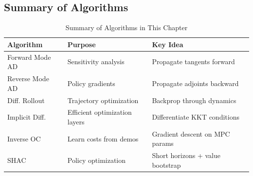 \subsection{Summary of Algorithms}

\begin{table}[htbp]
\centering
\caption{Summary of Algorithms in This Chapter}
\label{tab:algorithm_summary}
\begin{tabular}{lll}
\toprule
\textbf{Algorithm} & \textbf{Purpose} & \textbf{Key Idea} \\
\midrule
Forward Mode AD & Sensitivity analysis & Propagate tangents forward \\
Reverse Mode AD & Policy gradients & Propagate adjoints backward \\
Diff. Rollout & Trajectory optimization & Backprop through dynamics \\
Implicit Diff. & Efficient optimization layers & Differentiate KKT conditions \\
Inverse OC & Learn costs from demos & Gradient descent on MPC params \\
SHAC & Policy optimization & Short horizons + value bootstrap \\
\bottomrule
\end{tabular}
\end{table}

